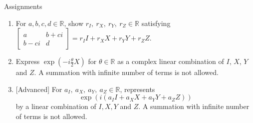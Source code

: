 \documentclass{beamer}
\begin{document}
\begin{frame}{Assignments}
\begin{enumerate}
\setlength{\itemsep}{2em}
\item For $a,b,c,d\in\mathbb{R}$, show $r_I,\ r_X,\ r_Y,\ r_Z\in\mathbb{R}$ satisfying $\begin{bmatrix}a&b+ci\\b-ci&d\end{bmatrix} = r_II+r_XX+r_YY+r_ZZ$.
\item Express $\exp\left(-i\frac{\theta}2 X\right)$ for $\theta\in\mathbb{R}$ as a complex linear combination of $I$, $X$, $Y$ and $Z$.
A summation with infinite number of terms is not allowed.
\item {[Advanced]} For $a_I,\ a_X,\ a_Y,\ a_Z\in\mathbb{R}$, represents
\begin{equation*}
\exp\left(i(a_II+a_XX+a_YY+a_ZZ)\right)
\end{equation*}
by a linear combination of $I, X, Y$ and $Z$.
A summation with infinite number of terms is not allowed.
\end{enumerate}
\end{frame}
\end{document}

